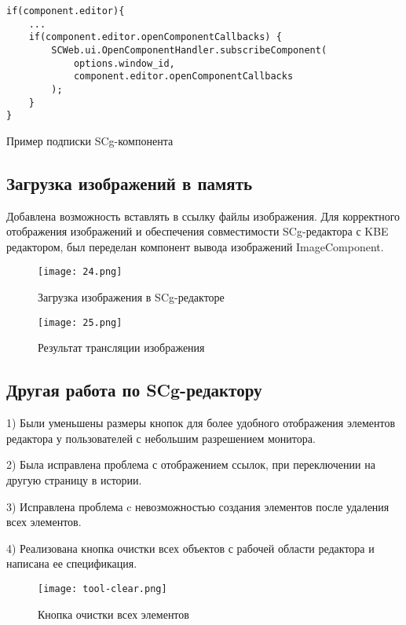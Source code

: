 \begin{listing}[H]
  \begin{verbatim}
if(component.editor){
    ...
    if(component.editor.openComponentCallbacks) {
        SCWeb.ui.OpenComponentHandler.subscribeComponent(
            options.window_id,
            component.editor.openComponentCallbacks
        );
    }
}
  \end{verbatim}
  \caption{Пример подписки SCg-компонента}
  \label{lst:practice:modelling_example}
\end{listing}

\newpage
\subsection{Загрузка изображений в память}

Добавлена возможность вставлять в ссылку файлы изображения. Для корректного отображения изображений и обеспечения совместимости SCg-редактора с KBE редактором, был переделан компонент вывода изображений ImageComponent.

\begin{figure}[H]
  \centering
  \texttt{[image: 24.png]}
  \caption{Загрузка изображения в SCg-редакторе}
  \label{fig:hardware:sdr_pipeline}
\end{figure}

\begin{figure}[H]
  \centering
  \texttt{[image: 25.png]}
  \caption{Результат трансляции изображения}
  \label{fig:hardware:sdr_pipeline}
\end{figure}

\newpage
\subsection{Другая работа по SCg-редактору}
1) Были уменьшены размеры кнопок для более удобного отображения элементов редактора у пользователей с небольшим разрешением монитора.

2) Была исправлена проблема с отображением ссылок, при переключении на другую страницу в истории.

3) Исправлена проблема c невозможностью создания элементов после удаления всех элементов. 

4) Реализована кнопка очистки всех объектов с рабочей области редактора и написана ее спецификация.

\begin{figure}[H]
  \centering
  \texttt{[image: tool-clear.png]}
  \caption{Кнопка очистки всех элементов}
  \label{fig:hardware:sdr_pipeline}
\end{figure}

